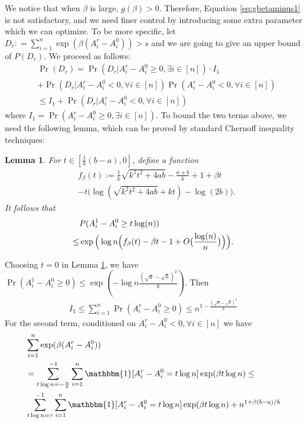 \documentclass[conference]{IEEEtran}
\newtheorem{lemma}{Lemma}
\begin{document}
	We notice that when $\beta$ is large, $g(\beta) > 0$. Therefore, Equation \eqref{eq:gbetaminus1} is not satisfactory, and
	we need finer control by introducing some extra parameter which we can optimize. To be more specific, let $D_r : = \sum_{i=1}^n\exp ( \beta(A^r_i-A^0_i)) > s$
	and we are going to give an upper bound of $P(D_r)$. We proceed as follows: 
	\begin{align*}
	&\Pr(D_r) = 
	\Pr(D_r| A_i^r - A_i^0 \geq 0, \exists i\in [n])
	\cdot I_1 \\
	&+ \Pr(D_r | A_i^r - A_i^0  < 0, \forall i\in [n])
	\Pr(  A_i^r - A_i^0  < 0 , \forall i \in [n] ) \\
	& \leq I_1
	+ \Pr(D_r | A_i^r - A_i^0  < 0, \forall i\in [n])
	\end{align*}
	where $I_1 = \Pr( A_i^r - A_i^0 \geq 0, \exists i\in [n])$.
	To bound the two terms above, we need the following lemma, which can be proved by standard Chernoff inequality techniques:
	\begin{lemma}\label{lem:fb}
		For $t\in [\frac{1}{k}(b-a), 0]$,
		define a function
		\begin{align*}
		&f_{\beta}(t):=\frac{1}{k}\sqrt{k^2t^2+4ab} -\frac{a+b}{k} +1 +\beta t  \\
		&-t\big(\log(\sqrt{k^2t^2+4ab}+kt)-\log(2b) \big).
		\end{align*}
		It follows that
		\begin{align} \label{eq:upba}
		& P(A^1_i-A^0_i\ge t\log(n))  \notag\\
		\le &  \exp\Big(\log n \Big(f_{\beta}(t) -\beta t  - 1 + O\big(\frac{\log(n)}{n}\big) \Big)\Big) .
		\end{align}
	\end{lemma}
	Choosing $t=0$ in Lemma \ref{lem:fb}, we have
	$\Pr(A^1_i-A^0_i\ge 0 ) \leq \exp(-\log n \frac{(\sqrt{a}-\sqrt{b})^2}{k})$.
	Then
	\begin{align*}
	I_1 \leq \sum_{i=1}^n \Pr( A_i^r - A_i^0 \geq 0) \leq n^{1-\frac{(\sqrt{a}-\sqrt{b})^2}{k}}
	\end{align*}
	For the second term,
	conditioned on $A_i^r - A_i^0  < 0, \forall i\in [n]$ we have
	\begin{align*}
	&\sum_{i=1}^n\exp ( \beta(A^r_i-A^0_i)) \\
	& = \sum_{t\log n =-\frac{n}{k}}^{-1}\sum_{i=1}^n \mathbbm{1}[A^r_i - A^0_i = t \log n] \exp ( \beta  t\log n)\leq \\ 
	&
	\sum_{t\log n =\tau}^{-1}\sum_{i=1}^n \mathbbm{1}[A^r_i - A^0_i = t \log n]\exp ( \beta  t\log n) + n^{1+\beta(b-a)/k}
	\end{align*}
\end{document}
